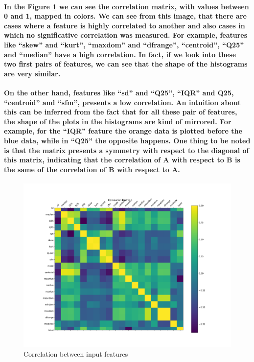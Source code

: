 \documentclass[a4paper]{article}    %
\begin{document}
\paragraph{In the Figure \ref{fig:pre-ex1-correlation} we can see the correlation matrix, with values between 0 and 1, mapped in colors. We can see from this image, that there are cases where a feature is highly correlated to another and also cases in which no significative correlation was measured. For example, features like ``skew'' and ``kurt'', ``maxdom'' and ``dfrange'', ``centroid'', ``Q25'' and ``median'' have a high correlation. In fact, if we look into these two first pairs of features, we can see that the shape of the histograms are very similar.}

\paragraph{On the other hand, features like ``sd'' and ``Q25'', ``IQR'' and Q25, ``centroid'' and ``sfm'', presents a low correlation. An intuition about this can be inferred from the fact that for all these pair of features, the shape of the plots in the histograms are kind of mirrored. For example, for the ``IQR'' feature the orange data is plotted before the blue data, while in ``Q25'' the opposite happens. One thing to be noted is that the matrix presents a symmetry with respect to the diagonal of this matrix, indicating that the correlation of A with respect to B is the same of the correlation of B with respect to A.}

\begin{figure}[H]
    \includegraphics[width=15cm]{correlation}
    \caption{Correlation between input features}
    \label{fig:pre-ex1-correlation}
\end{figure}
\end{document}
